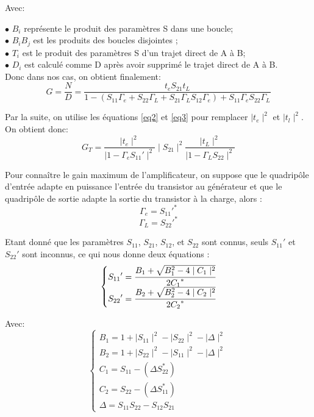 \documentclass[french]{article}
\begin{document}
Avec:

$\bullet$ $B_{i}$ représente le produit des paramètres S dans une boucle;\\
$\bullet$ $B_{i}B_{j}$ est les produits des boucles disjointes ;\\
$\bullet$ $T_{i}$ est le produit des paramètres S d’un trajet direct de A à B;\\
$\bullet$ $D_{i}$ est calculé comme D après avoir supprimé le trajet direct de A à B.\\

Donc dans nos cas, on obtient finalement:
\begin{equation}
	G=\frac{N}{D}=\frac{t_{e}S_{21}t_{L}}{1-\left (S_{11}\Gamma_{e}+S_{22}\Gamma_{L}+S_{21}\Gamma_{L}S_{12}\Gamma_{e}\right)+S_{11}\Gamma_{e}S_{22}\Gamma_{L}}
\end{equation}

Par la suite, on utilise les équations \ref{eq2} et \ref{eq3} pour remplacer $\mid t_{e}\mid ^{2}$ et $\mid t_{l}\mid ^{2}$. On obtient donc:
\begin{equation}
	G_{T}=\frac{\mid t_{e}\mid ^{2}}{\mid 1-\Gamma_{e}{S_{11}}'\mid ^{2}}\mid S_{21}\mid ^{2}\frac{\mid t_{L}\mid ^{2}}{\mid 1-\Gamma_{L}S_{22}\mid^{2}}
\end{equation}

Pour connaître le gain maximum de l’amplificateur, on suppose que le quadripôle d’entrée adapte en puissance l’entrée du transistor au générateur et que le quadripôle de sortie adapte la sortie du transistor à la charge, alors :
\begin{equation}
	\Gamma_{e}={S_{11}}'^\ast
\end{equation}
\begin{equation}
	\Gamma_{L}={S_{22}}'^\ast
\end{equation}

Etant donné que les paramètres $S_{11}$, $S_{21}$, $S_{12}$, et $S_{22}$ sont connus, seuls ${S_{11}}'$ et ${S_{22}}'$ sont inconnus, ce qui nous donne deux équations :
\begin{equation}
	\left\{\begin{matrix}
		{S_{11}}'=\cfrac{B_{1}+\sqrt{B_{1}^{2}-4\mid C_{1}\mid^{2}}}{2{C_{1}}^\ast}\\
		{S_{22}}'=\cfrac{B_{2}+\sqrt{B_{2}^{2}-4\mid C_{2}\mid^{2}}}{2{C_{2}}^\ast}
	\end{matrix}\right.
\end{equation}

Avec:
\begin{equation}
	\left\{\begin{matrix}
		B_{1}=1+\mid S_{11}\mid^{2}-\mid S_{22}\mid^{2}-\mid \Delta \mid^{2}\\
		B_{2}=1+\mid S_{22}\mid^{2}-\mid S_{11}\mid^{2}-\mid \Delta \mid^{2}\\
		C_{1}=S_{11}-\left(\Delta S_{22}^\ast\right)\\
		C_{2}=S_{22}-\left(\Delta S_{11}^\ast\right)\\
		\Delta=S_{11}S_{22}-S_{12}S_{21}
	\end{matrix}\right.
\end{equation}
\end{document}
